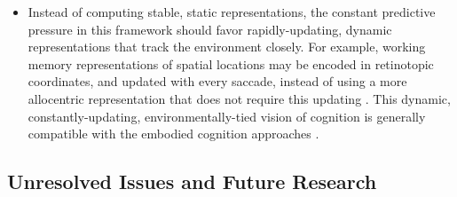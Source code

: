 \documentclass[11pt,twoside]{article}
\newif\myifpdf
\begin{document}
\begin{itemize}
\item Instead of computing stable, static representations, the constant predictive pressure in this framework should favor rapidly-updating, dynamic representations that track the environment closely.  For example, working memory representations of spatial locations may be encoded in retinotopic coordinates, and updated with every saccade, instead of using a more allocentric representation that does not require this updating \cite{Wurtz08,CavanaghHuntAfrazEtAl10,FixRougierAlexandre11}.  This dynamic, constantly-updating, environmentally-tied vision of cognition is generally compatible with the embodied cognition approaches \cite{Barsalou08,Barsalou09,Anderson03a,SmithThelen03}.  
\end{itemize}

\subsection{Unresolved Issues and Future Research}
\end{document}
